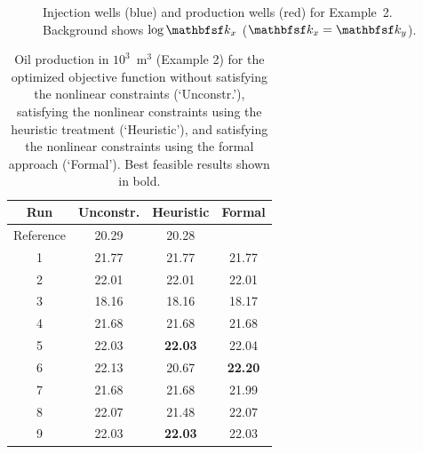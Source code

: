 \begin{figure}[ht]
\begin{center}

\end{center}
     \caption{Injection wells (blue) and production wells (red) for Example~2. Background shows $\log \tens{k}_x$ ($\tens{k}_x = \tens{k}_y$).}
  \label{fig:PermeabilityMapAndWellsSpe10Top}
\end{figure}
%

\begin{table}
\centering
\caption{Oil production in $10^3$~m$^3$ (Example 2) for the optimized objective function
         without satisfying the nonlinear constraints (`Unconstr.'), satisfying the nonlinear constraints
         using the heuristic treatment (`Heuristic'), and satisfying the nonlinear constraints
         using the formal approach (`Formal'). Best feasible results shown in bold.}
\begin{tabular}{|c|c|c|c|}
\hline
  Run            &  Unconstr. & Heuristic & Formal      \\
\hline
Reference        & 20.29         &     20.28         & 	         \\
1 & 21.77      &     21.77         &       21.77    \\
2 & 22.01      &     22.01         &       22.01    \\
3 & 18.16      &     18.16         &       18.17    \\
4 & 21.68      &     21.68         &       21.68    \\
5 & 22.03      & \bf{22.03}      &       22.04    \\
6 & 22.13      &     20.67         &  \bf{22.20}    \\
7 & 21.68      &     21.68         &       21.99    \\
8 & 22.07      &     21.48         &       22.07    \\
9 & 22.03      & \bf{22.03}      &       22.03    \\
\hline
\end{tabular}
  \label{table:spe10top}
\end{table}



